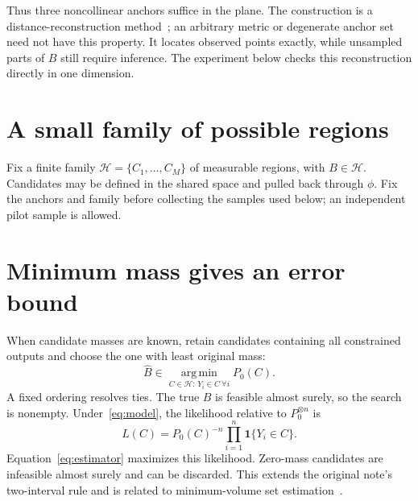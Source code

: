\documentclass[10pt,letterpaper]{article}
\theoremstyle{typed}
\begin{document}
Thus three noncollinear anchors suffice in the plane. The construction
is a distance-reconstruction method~\cite{edm}; an arbitrary metric or
degenerate anchor set need not have this property. It locates observed
points exactly, while unsampled parts of $B$ still require inference.
The experiment below checks this reconstruction directly in one dimension.

\section{A small family of possible regions}

Fix a finite family $\mathcal H=\{C_1,\ldots,C_M\}$ of measurable regions,
with $B\in\mathcal H$. Candidates may be defined in the shared space and
pulled back through $\phi$. Fix the anchors and family before collecting
the samples used below; an independent pilot sample is allowed.

\section{Minimum mass gives an error bound}

When candidate masses are known, retain candidates containing all
constrained outputs and choose the one with least original mass:
\begin{equation}
  \widehat B\in\operatorname*{arg\,min}_{C\in\mathcal H:\,Y_i\in C\ \forall i}
  P_0(C).
  \label{eq:estimator}
\end{equation}
A fixed ordering resolves ties. The true $B$ is feasible almost surely,
so the search is nonempty. Under~\eqref{eq:model}, the likelihood relative
to $P_0^{\otimes n}$ is
\[
  L(C)=P_0(C)^{-n}\prod_{i=1}^n\mathbf1\{Y_i\in C\}.
\]
Equation~\eqref{eq:estimator} maximizes this likelihood. Zero-mass
candidates are infeasible almost surely and can be discarded. This
extends the original note's two-interval rule and is related to
minimum-volume set estimation~\cite{scott}.
\end{document}
